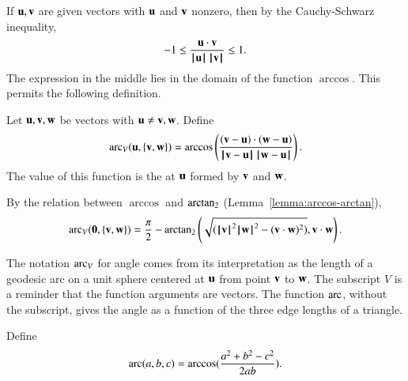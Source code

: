 If $\u,\v$ are given vectors with $\u$ and $\v$ nonzero, then by the
Cauchy-Schwarz inequality,
    \begin{displaymath}-1 \le \frac{\u\cdot \v}{\normo{\u}\,\normo{\v}} \le 1.\end{displaymath}
The expression in the middle lies in the domain of the function $\arccos$. This permits the following definition.
%
%
%

\begin{definition}\label{def:angle}
Let $\u,\v,\w$ be vectors with $\u\ne \v,\w$.
Define 
    \begin{displaymath}
    \arc_V(\u,\{\v,\w\}) = \arccos\left(\frac{(\v-\u)\cdot (\w-\u)}{\norm{\v}{\u}\,\norm{\w}{\u}}\right).
    \end{displaymath}
The value of this function is the  at $\u$ formed by $\v$ and $\w$.
%
%
%
%
%
\end{definition}

By the relation between $\arccos$ and $\atn$
(Lemma~\ref{lemma:arccos-arctan}), %
    \begin{equation}\label{eqn:angle}
    \arc_V(\orz,\{\v,\w\}) = \frac{\pi}2 - \atn\left ({\sqrt{(\normo{\v}^2\normo{\w}^2 -
    (\v\cdot \w)^2)}}, {\v\cdot \w}\right).
    \end{equation}
%

The notation $\arc_V$ for angle comes from its interpretation as the
length of a geodesic arc on a unit sphere
centered at $\u$ from point $\v$ to $\w$.
%
The subscript $V$ is a reminder that
the function arguments are vectors.  The function
$\arc$, without the subscript,  gives the angle as a function
of the three edge lengths of a triangle.
%
%
%


\begin{definition}[arc]\label{def:arc}
Define
 \begin{displaymath}\arc(a,b,c) = \arccos(\frac{a^2 + b^2 - c^2}{2 a b}).\end{displaymath}
%
\end{definition}

